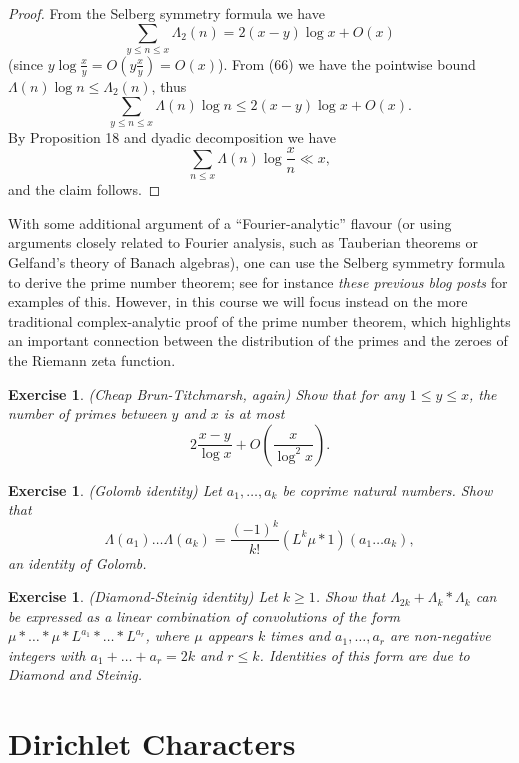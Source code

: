 \documentclass[10pt,reqno]{amsart}
\newtheorem{exercise}[theorem]{Exercise}
\begin{document}
\begin{proof}
    From the Selberg symmetry formula we have
    \[  \sum_{y \leq n\leq x} \Lambda_2(n) = 2(x-y) \log x + O( x ) \]
    (since $y \log \frac{x}{y} = O(y \frac{x}{y} ) = O(x)$). From (66) we have the pointwise bound $\Lambda(n) \log n \leq \Lambda_2(n)$, thus
    \[  \sum_{y \leq n\leq x} \Lambda(n) \log n \leq 2(x-y) \log x + O( x ).\]
    By Proposition 18 and dyadic decomposition we have
    \[  \sum_{n \leq x} \Lambda(n) \log \frac{x}{n} \ll x,\]
    and the claim follows. %
\end{proof}

With some additional argument of a “Fourier-analytic” flavour (or using arguments closely related to Fourier analysis, such as Tauberian theorems or Gelfand’s theory of Banach algebras), one can use the Selberg symmetry formula to derive the prime number theorem; see for instance \emph{these previous blog posts} for examples of this. However, in this course we will focus instead on the more traditional complex-analytic proof of the prime number theorem, which highlights an important connection between the distribution of the primes and the zeroes of the Riemann zeta function.

\begin{exercise}
    (Cheap Brun-Titchmarsh, again) Show that for any $1 \leq y \leq x$, the number of primes between $y$ and $x$ is at most
    \[ 2\frac{x-y}{\log x} + O( \frac{x}{\log^2 x}). \]
\end{exercise}

\begin{exercise} (Golomb identity) Let $a_1,\dots,a_k$ be coprime natural numbers. Show that
    \[  \Lambda(a_1) \dots \Lambda(a_k) = \frac{(-1)^k}{k!} (L^k\mu * 1)(a_1 \dots a_k ),\]
    an \emph{identity of Golomb}.
\end{exercise}

\begin{exercise} (Diamond-Steinig identity) Let $k \geq 1$. Show that $\Lambda_{2k} + \Lambda_k * \Lambda_k$ can be expressed as a linear combination of convolutions of the form $\mu * \dots * \mu * L^{a_1} * \dots * L^{a_r}$, where $\mu$ appears $k$ times and $a_1,\dots,a_r$ are non-negative integers with $a_1+\dots+a_r = 2k$ and $r \leq k$. Identities of this form are due to \emph{Diamond and Steinig}.
\end{exercise}

\section{Dirichlet Characters}
\end{document}
